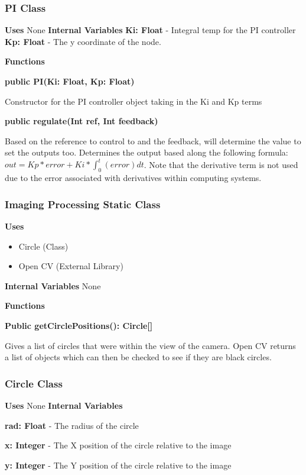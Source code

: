 \documentclass [10pt]{article}
\begin{document}
\subsubsection{PI Class}
\textbf{Uses}
None 
\textbf{Internal Variables}
\textbf{Ki: Float} - Integral temp for the PI controller
\textbf{Kp: Float} - The y coordinate of the node.

\textbf{Functions}

\textbf{public PI(Ki: Float, Kp: Float)}

Constructor for the PI controller object taking in the Ki and Kp terms

\textbf{public regulate(Int ref, Int feedback)}

Based on the reference to control to and the feedback, will determine the value to set the outputs too. Determines the output based along the following formula: $ out = Kp*error+Ki*\int_{0}^{t}(error)dt$. Note that the derivative term is not used due to the error associated with derivatives within computing systems.


\subsubsection{Imaging Processing Static Class}
\textbf{Uses}
\begin{itemize}
	\item Circle (Class)
	\item Open CV (External Library)
\end{itemize}


\textbf{Internal Variables}
None

\textbf{Functions}

\textbf{Public getCirclePositions(): Circle[]}

Gives a list of circles that were within the view of the camera. Open CV returns a list of objects which can then be checked to see if they are black circles.

\subsubsection{Circle Class}

\textbf{Uses}
None
\textbf{Internal Variables}

\textbf{rad: Float} - The radius of the circle

\textbf{x: Integer} - The X position of the circle relative to the image

\textbf{y: Integer} - The Y position of the circle relative to the image 
\end{document}
